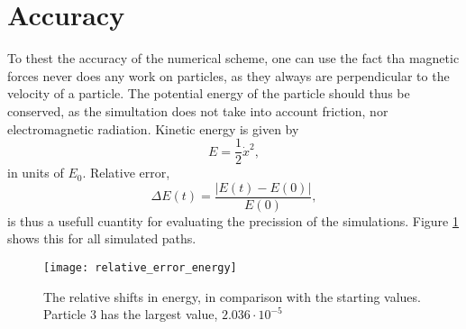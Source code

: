 \documentclass{article}
\begin{document}
    \section*{Accuracy}
    To thest the accuracy of the numerical scheme, one can use the fact tha magnetic forces never does any work on particles, as they always are perpendicular to the velocity of a particle. The potential energy of the particle should thus be conserved, as the simultation does not take into account friction, nor electromagnetic radiation. Kinetic energy is given by
    $$
        E = \frac{1}{2}\dot x^2,
    $$
    in units of $E_0$. Relative error,
    $$
        \Delta E(t) = \frac{|E(t) - E(0)|}{E(0)},
    $$
    is thus a usefull cuantity for evaluating the precission of the simulations. Figure \ref{relative error} shows this for all simulated paths.
    \begin{figure}
        \centering
        \texttt{[image: relative\_error\_energy]}
        \label{relative error}
        \caption{The relative shifts in energy, in comparison with the starting values. Particle 3 has the largest value, $2.036 \cdot 10^{-5}$}
    \end{figure}
\end{document}
